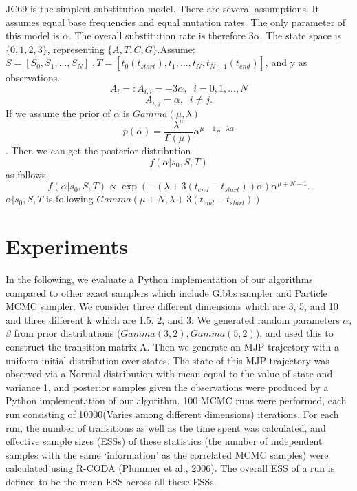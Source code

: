 JC69 is the simplest substitution model. There are several assumptions. It assumes equal base frequencies and equal mutation rates. The only parameter of this model is $\alpha$. The overall substitution rate is therefore $3\alpha$. The state space is $\{0, 1, 2, 3\}$, representing $\{A, T, C, G\}$.\noindent Assume: $S = [S_0,S_1, ...,S_N] \;, T = [t_0(t_{start}), t_1,...,t_N, t_{N+1}(t_{end})]$, and y as observations.\\
$$A_i =: A_{i,i} = -3\alpha, \; \; i =0,1,...,N$$ $$A_{i, j} = \alpha, \; \; i \neq j.$$
If we assume the prior of $\alpha$ is $Gamma(\mu,\lambda)$\\
$$p(\alpha) = \frac{\lambda^\mu}{\Gamma(\mu)}\alpha^{\mu -1}e^{-\lambda \alpha} $$.
Then we can get the posterior distribution $$f(\alpha | s_0,S,T)$$ as follows.
$$ f(\alpha| s_0,S,T) \propto \exp(-(\lambda + 3(t_{end} - t_{start}))\alpha) \alpha^{\mu + N -1} .$$
$\alpha | s_0,S,T$ is following $Gamma(\mu+ N,\lambda + 3(t_{end} - t_{start}))$\\
\section{Experiments}
In the following, we evaluate a Python implementation of our algorithms compared to other exact samplers which include Gibbs sampler and Particle MCMC sampler. We consider three different dimensions which are 3, 5, and 10 and three different k which are 1.5, 2, and 3. We generated random parameters $\alpha$, $\beta$ from prior distributions ($Gamma(3,2), Gamma(5, 2)$), and used this to construct the transition matrix A. Then we generate an MJP trajectory with a uniform initial distribution over states. The state of this MJP trajectory was observed via a Normal distribution with mean equal to the value of state and variance 1, and posterior samples given the observations were produced by a Python implementation of our algorithm. 100 MCMC runs were performed, each run consisting of 10000(Varies among different dimensions) iterations. For each run, the number of transitions as well as the time spent was calculated, and effective sample sizes (ESSs) of these statistics (the number of independent samples with the same `information' as the correlated MCMC samples) were calculated using R-CODA (Plummer et al., 2006). The overall ESS of a run is defined to be the mean ESS across all these ESSs.

